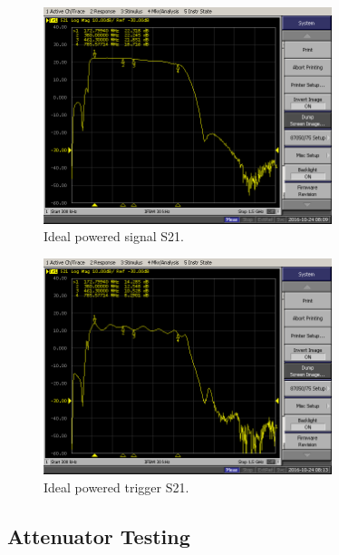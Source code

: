 \documentclass[letter,12pt]{article}
\begin{document}
\begin{figure}
\begin{centering}
\includegraphics[width=0.75\textwidth]{photos/IDEAL-S21-SIG-POWER.PNG}
\par\end{centering}
\caption{Ideal powered signal S21.}
\label{ideal-sig-s21-pwr}
\end{figure}

\begin{figure}
\begin{centering}
\includegraphics[width=0.75\textwidth]{photos/IDEAL-S21-TRIG-POWER.PNG}
\par\end{centering}
\caption{Ideal powered trigger S21.}
\label{idea-trig-s21-pwr}
\end{figure}

\subsection{Attenuator Testing \label{subsec:RFAttenuator-Testing}}
\end{document}
